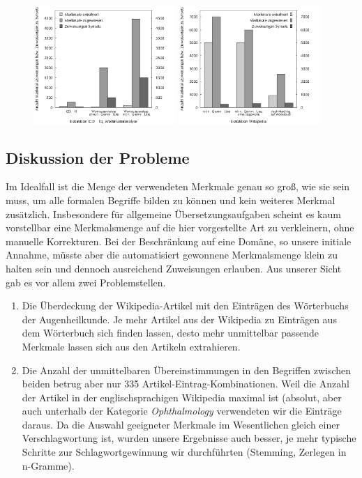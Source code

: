 \documentclass[pagesize,DIV=calc,12pt,draft]{scrreprt}
\begin{document}
\begin{figure}[!ht]
\includegraphics[width=0.48\textwidth]{icd10_affixe}
\hfill
\includegraphics[width=0.48\textwidth]{wiki_extraktion}
\end{figure}

\subsection{Diskussion der Probleme}

Im Idealfall ist die Menge der verwendeten Merkmale genau so groß, wie sie sein muss, um alle formalen Begriffe bilden zu können und kein weiteres Merkmal zusätzlich. 
Insbesondere für allgemeine Übersetzungsaufgaben scheint es kaum vorstellbar eine Merkmalsmenge auf die hier vorgestellte Art zu verkleinern, ohne manuelle Korrekturen. 
Bei der Beschränkung auf eine Domäne, so unsere initiale Annahme, müsste aber die automatisiert gewonnene Merkmalsmenge klein zu halten sein und dennoch ausreichend Zuweisungen erlauben. 
Aus unserer Sicht gab es vor allem zwei Problemstellen. 
\begin{enumerate}
\item Die Überdeckung der Wikipedia-Artikel mit den Einträgen des Wörterbuchs der Augenheilkunde. 
Je mehr Artikel aus der Wikipedia zu Einträgen aus dem Wörterbuch sich finden lassen, desto mehr unmittelbar passende Merkmale lassen sich aus den Artikeln extrahieren. 
\item Die Anzahl der unmittelbaren Übereinstimmungen in den Begriffen zwischen beiden betrug aber nur 335 Artikel-Eintrag-Kombinationen. 
Weil die Anzahl der Artikel in der englischsprachigen Wikipedia maximal ist (absolut, aber auch unterhalb der Kategorie \emph{Ophthalmology} verwendeten wir die Einträge daraus. 
Da die Auswahl geeigneter Merkmale im Wesentlichen gleich einer Verschlagwortung ist, wurden unsere Ergebnisse auch besser, je mehr typische Schritte zur Schlagwortgewinnung wir durchführten (Stemming, Zerlegen in n-Gramme). 
\end{enumerate}
\end{document}
